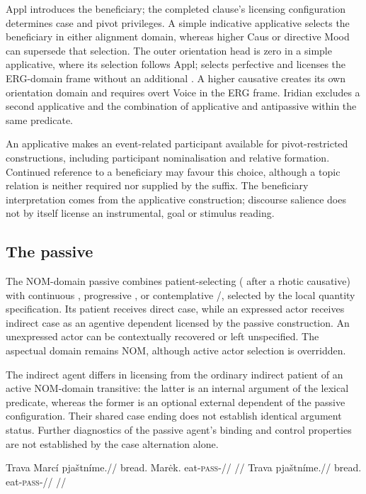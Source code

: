 Appl introduces the beneficiary; the completed clause's licensing configuration
determines case and pivot privileges. A simple indicative applicative selects
the beneficiary in either alignment domain, whereas higher Caus or directive
Mood can supersede that selection. The outer orientation head is zero in a simple applicative, where its
selection follows Appl;  selects perfective  and
licenses the ERG-domain frame without an additional . A higher
causative creates its own orientation domain and requires overt Voice
 in the ERG frame. Iridian excludes a
second applicative and the combination of applicative and antipassive within
the same predicate.

An applicative makes an event-related participant available for pivot-restricted
constructions, including participant nominalisation and relative formation.
Continued reference to a beneficiary may favour this choice, although a topic
relation is neither required nor supplied by the suffix. The beneficiary
interpretation comes from the applicative construction; discourse salience
does not by itself license an instrumental, goal or stimulus reading.

\subsection{The passive}\label{sec:vm-passive}

The NOM-domain passive combines patient-selecting 
( after a rhotic causative) with continuous
, progressive , or contemplative /, selected by the local
quantity specification. Its patient
receives direct case, while an expressed actor receives indirect case as an
agentive dependent licensed by the passive construction. An unexpressed actor
can be contextually recovered or left unspecified. The aspectual domain remains
NOM, although active actor selection is overridden.

The indirect agent differs in licensing from the ordinary indirect patient of
an active NOM-domain transitive: the latter is an internal argument of the
lexical predicate, whereas the former is an optional external dependent of the
passive configuration. Their shared case ending does not establish identical
argument status. Further diagnostics of the passive agent's binding and control
properties are not established by the case alternation alone.

\pex
\a
\begingl
\gla Trava Marcí pjaštníme.//
\glb bread.\Dir{} Marėk.\Ind{} eat-\textsc{pass}-\Prog{}//
\glft {}//
\endgl
\a
\begingl
\gla Trava pjaštníme.//
\glb bread.\Dir{} eat-\textsc{pass}-\Prog{}//
\glft {}//
\endgl
\xe

